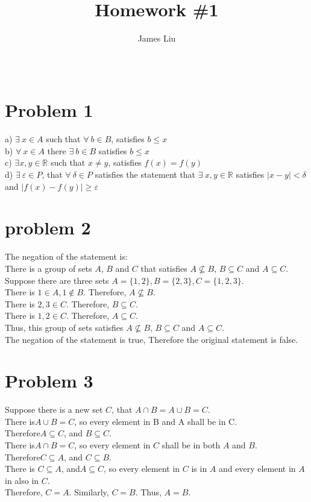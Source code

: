 \documentclass{article}
\begin{document}
\title{\textbf{Homework \#1 }}
\author{James Liu}
\date{\ }
\maketitle
\section*{Problem 1}
    
    a) \( \exists \ x\in A\) such that \(\forall \ b \in B\), satisfies \(b \le x\)\\
    b) \( \forall \ x \in A\) there \( \exists \ b\in B\) satisfies \(b \le x\)\\
    c) \( \exists x,y \in \mathbb{R}\) such that \(x\neq y\), satisfies \(f(x)=f(y)\)\\
    d) \( \exists \ \varepsilon \in P\), that \( \forall \ \delta \in P\) satisfies the
    statement that \(\exists \ x,y \in \mathbb{R}\) satisfies \(|x-y| < \delta\) and \(|f(x)-f(y)|\geq \varepsilon\)
\section*{problem 2}
    The negation of the statement is: \\
    There is a group of sets \(A\), \(B\) and \(C\) that satisfies \(A\nsubseteq B\), \(B \subseteq C\) and \(A \subseteq C\).
    Suppose there are three sets \(A=\{1,2\}, B=\{2,3\},C=\{1,2,3\}\). \\ 
    There is \(1 \in A, 1\notin B\). Therefore, \(A \nsubseteq B\).\\
    There is \(2,3 \in C\). Therefore, \(B \subseteq C\).\\
    There is \(1,2 \in C\). Therefore, \(A \subseteq C\).\\
    Thus, this group of sets satisfies \(A\nsubseteq B\), \(B \subseteq C\) and \(A \subseteq C\).\\
    The negation of the statement is true, Therefore the original statement is false.
\section*{Problem 3}
    Suppose there is a new set \(C\), that \(A\cap B = A\cup B = C\).\\
    There is\(A\cup B =C\), so every element in B and A shall be in C. \\
    Therefore\(A\subseteq C\), and \(B \subseteq C\).\\
    There is\(A\cap B =C\), so every element in \(C\) shall be in both \(A\) and \(B\).\\
    Therefore\(C\subseteq A\), and \(C \subseteq B\).\\
    There is \(C\subseteq A\), and\(A \subseteq C\), so every element in \(C\) is in \(A\) and every element in \(A\) in also in \(C\).\\
    Therefore, \(C = A\). Similarly, \(C = B\). Thus, \(A=B\).
\end{document}
